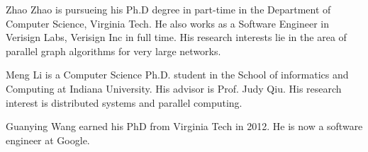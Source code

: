 \documentclass[10pt,journal,compsoc]{IEEEtran}
\begin{document}



% 

\begin{IEEEbiography}{Zhao Zhao}
 is pursueing his Ph.D degree in part-time in the Department of
Computer Science, Virginia Tech. He also works as a Software Engineer in
Verisign Labs, Verisign Inc in full time. His research interests lie in the area
of parallel graph algorithms for very large networks. 
\end{IEEEbiography}

\begin{IEEEbiography}{Meng Li}
 is a Computer Science Ph.D. student in the School of informatics and
Computing at Indiana University. His advisor is Prof. Judy Qiu. His research
interest is distributed systems and parallel computing.
\end{IEEEbiography}

\begin{IEEEbiography}{Guanying Wang}
 earned his PhD from Virginia Tech in 2012. He is now a software
engineer at Google.
\end{IEEEbiography}
\end{document}
